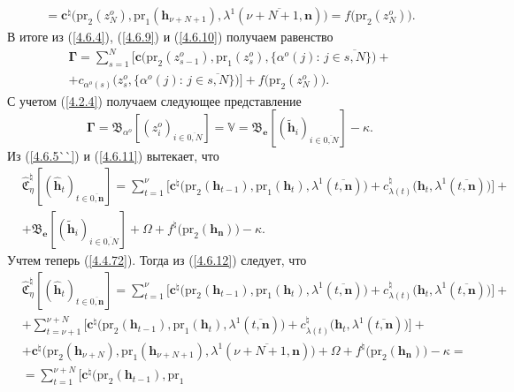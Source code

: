 \documentclass[11pt,twoside,openany]{report}
\newcommand{\bfn}{\begin{equation}}
\newcommand{\efn}{\end{equation}}
\newcommand{\ov}{\overline}
\newcommand{\Om}{\Omega}
\newcommand{\la}{\lambda}
\newcommand{\al}{\alpha}
\newcommand{\zc}{{\mathbf c}}
\newcommand{\nn}{{\mathbf n}}
\begin{document}
{{\begin{eqnarray}
&=\zc^\natural\bigl(\mathrm{pr}_2(z_N^o),\mathrm{pr}_1(\mathbf{h}_{\nu+N+1}),\la^1(\ov{\nu+N+1,\nn})
\bigl) = f\bigl(\mathrm{pr}_2(z_N^o)\bigl).
&\label{4.6.10}
\end{eqnarray}
В итоге из (\ref{4.6.4}), (\ref{4.6.9}) и  (\ref{4.6.10}) получаем равенство
$$
\begin{array}{c}
\mathbf{\Gamma} = \sum\limits_{s=1}^N\bigl[\zc\bigl(\mathrm{pr}_2(z_{s-1}^o),
\mathrm{pr}_1(z_s^o),\{\al^o(j):
\,j\in\ov{s,N}\}\bigl)+
\\
+c_{\al^o(s)}\bigl(z_s^o,\{\al^o(j):\,j\in\ov{s,N}\}\bigl)\bigl]
+f\bigl(\mathrm{pr}_2(z_N^o)\bigl).
\end{array}
$$
С учетом (\ref{4.2.4}) получаем следующее представление
\bfn\label{4.6.11}
\mathbf{\Gamma}= \mathfrak{B}_{\al^o}[(z_i^o)_{i\in\ov{0,N}}] =\mathbb{V}=
\mathfrak{B}_\mathbf{e}[(\tilde{\mathbf{h}}_i)_{i\in\ov{0,N}}] - \kappa.
\efn
Из (\ref{4.6.5``}) и (\ref{4.6.11}) вытекает, что
\begin{eqnarray}
&\widehat{\mathfrak{C}}_\eta^\natural[(\hat{\mathbf{h}}_t)_{t\in\ov{0,\nn}}]=
\sum\limits_{t=1}^\nu\bigl[\zc^\natural\bigl(\mathrm{pr}_2(\mathbf{h}_{t-1}),
\mathrm{pr}_1(\mathbf{h}_t),
\la^1(\ov{t,\nn})\bigl) + c_{\la(t)}^\natural\bigl(\mathbf{h}_t,\la^1(\ov{t,\nn})\bigl)\bigl] +
&\nonumber\\
&+ \mathfrak{B}_\mathbf{e}
[(\tilde{\mathbf{h}}_i)_{i\in\ov{0,N}}] + \Om +
f^\natural\bigl(\mathrm{pr}_2(\mathbf{h}_\nn)\bigl) -\kappa.
&\label{4.6.12}
\end{eqnarray}
Учтем теперь (\ref{4.4.72}). Тогда из (\ref{4.6.12}) следует, что
\begin{eqnarray}
&\widehat{\mathfrak{C}}_\eta^\natural[(\hat{\mathbf{h}}_t)_{t\in\ov{0,\nn}}]=
\sum\limits_{t=1}^\nu\bigl[\zc^\natural\bigl(\mathrm{pr}_2(\mathbf{h}_{t-1}),\mathrm{pr}_1(\mathbf{h}_t),
 \la^1(\ov{t,\nn})\bigl) + c_{\la(t)}^\natural\bigl(\mathbf{h}_t,\la^1(\ov{t,\nn})\bigl)\bigl] +
&\nonumber\\
&+\sum\limits_{t=\nu+1}^{\nu+N}\bigl[\zc^\natural\bigl(\mathrm{pr}_2(\mathbf{h}_{t-1}),\mathrm{pr}_1
(\mathbf{h}_t),\la^1(\ov{t,\nn})\bigl)+ c_{\la(t)}^\natural\bigl(\mathbf{h}_t,\la^1(\ov{t,\nn})\bigl)\bigl] +
&\nonumber\\
&+ \zc^\natural\bigl(\mathrm{pr}_2(\mathbf{h}_{\nu+N}),\mathrm{pr}_1(\mathbf{h}_{\nu+N+1}),
\la^1(\ov{\nu+N+1,\nn})\bigl)+ \Om + f^\natural\bigl(\mathrm{pr}_2(\mathbf{h}_\nn)\bigl) -\kappa =
&\nonumber\\
&= \sum\limits_{t=1}^{\nu+N}\bigl[\zc^\natural\bigl(\mathrm{pr}_2(\mathbf{h}_{t-1}),\mathrm{pr}_1

\end{eqnarray}}}
\end{document}
